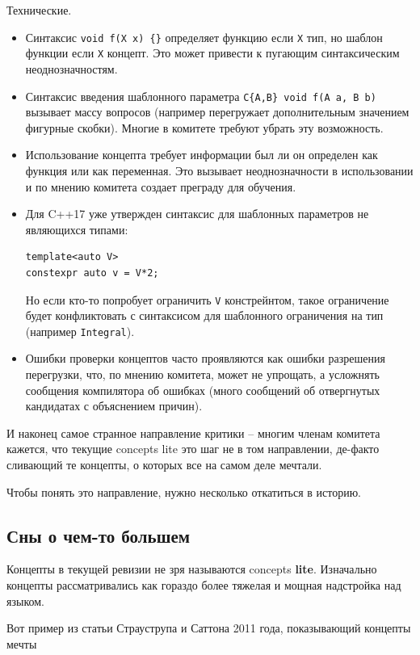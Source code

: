 \documentclass[a4paper,12pt,oneside]{book}
\begin{document}
Технические.

\begin{itemize}
\item Синтаксис \lstinline!void f(X x) {}! определяет функцию если \lstinline!X! тип, но шаблон функции если \lstinline!X! концепт. Это может привести к пугающим синтаксическим неоднозначностям.
\item Синтаксис введения шаблонного параметра \lstinline!C{A,B} void f(A a, B b)! вызывает массу вопросов (например перегружает дополнительным значением фигурные скобки). Многие в комитете требуют убрать эту возможность.
\item Использование концепта требует информации был ли он определен как функция или как переменная. Это вызывает неоднозначности в использовании и по мнению комитета создает преграду для обучения.
\item Для C++17 уже утвержден синтаксис для шаблонных параметров не являющихся типами:
\begin{lstlisting}
template<auto V>
constexpr auto v = V*2;
\end{lstlisting}
Но если кто-то попробует ограничить \lstinline!V! констрейнтом, такое ограничение будет конфликтовать с синтаксисом для шаблонного ограничения на тип (например \lstinline!Integral!).
\item Ошибки проверки концептов часто проявляются как ошибки разрешения перегрузки, что, по мнению комитета, может не упрощать, а усложнять сообщения компилятора об ошибках (много сообщений об отвергнутых кандидатах с объяснением причин).
\end{itemize}

И наконец самое странное направление критики -- многим членам комитета кажется, что текущие concepts lite это шаг не в том направлении, де-факто сливающий те концепты, о которых все на самом деле мечтали.

Чтобы понять это направление, нужно несколько откатиться в историю.

\subsection{Сны о чем-то большем}\label{BetterConstraints}

Концепты в текущей ревизии не зря называются concepts \textbf{lite}. Изначально концепты рассматривались как гораздо более тяжелая и мощная надстройка над языком.

Вот пример из статьи Страуструпа и Саттона 2011 года, показывающий концепты мечты
\end{document}
